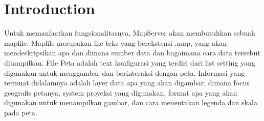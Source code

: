 ﻿\section{Introduction}

Untuk memanfaatkan fungsionalitasnya, MapServer akan membutuhkan sebuah mapfile. Mapfile merupakan file teks yang berekstensi .map,
yang akan mendeskripsikan apa dan dimana sumber data dan bagaimana cara data tersebut ditampilkan. 
File Peta adalah text konfigurasi yang terdiri dari list setting yang digunakan untuk menggambar dan berinteraksi dengan peta. 
Informasi yang termuat didalamnya adalah layer data apa yang akan digambar, dimana focus geografis petanya, 
system proyeksi yang digunakan, format apa yang akan digunakan untuk menampilkan gambar, dan cara menentukan legenda dan skala pada peta.

